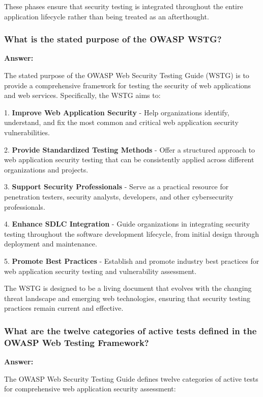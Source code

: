 \documentclass[12pt,a4paper]{article}
\begin{document}
These phases ensure that security testing is integrated throughout the entire application lifecycle rather than being treated as an afterthought.

\subsubsection{What is the stated purpose of the OWASP WSTG?}

\textbf{Answer:}

The stated purpose of the OWASP Web Security Testing Guide (WSTG) is to provide a comprehensive framework for testing the security of web applications and web services. Specifically, the WSTG aims to:

1. \textbf{Improve Web Application Security} - Help organizations identify, understand, and fix the most common and critical web application security vulnerabilities.

2. \textbf{Provide Standardized Testing Methods} - Offer a structured approach to web application security testing that can be consistently applied across different organizations and projects.

3. \textbf{Support Security Professionals} - Serve as a practical resource for penetration testers, security analysts, developers, and other cybersecurity professionals.

4. \textbf{Enhance SDLC Integration} - Guide organizations in integrating security testing throughout the software development lifecycle, from initial design through deployment and maintenance.

5. \textbf{Promote Best Practices} - Establish and promote industry best practices for web application security testing and vulnerability assessment.

The WSTG is designed to be a living document that evolves with the changing threat landscape and emerging web technologies, ensuring that security testing practices remain current and effective.

\subsubsection{What are the twelve categories of active tests defined in the OWASP Web Testing Framework?}

\textbf{Answer:}

The OWASP Web Security Testing Guide defines twelve categories of active tests for comprehensive web application security assessment:
\end{document}
